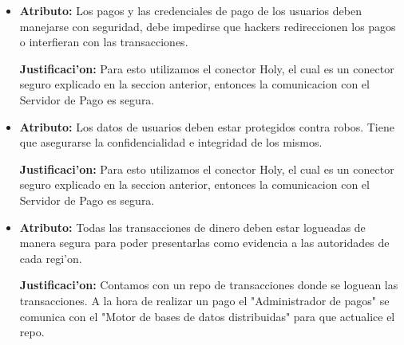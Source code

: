 \begin{itemize}
\item \textbf{Atributo:} Los pagos y las credenciales de pago de los usuarios deben manejarse con seguridad, debe impedirse que hackers redireccionen los pagos o interfieran con las transacciones.

\textbf{Justificaci'on:} Para esto utilizamos el conector Holy, el cual es un conector seguro explicado en la seccion anterior, entonces la comunicacion con el Servidor de Pago es segura.

\item \textbf{Atributo:} Los datos de usuarios deben estar protegidos contra robos. Tiene que asegurarse la confidencialidad e integridad de los mismos.

 \textbf{Justificaci'on:} Para esto utilizamos el conector Holy, el cual es un conector seguro explicado en la seccion anterior, entonces la comunicacion con el Servidor de Pago es segura.

\item \textbf{Atributo:} Todas las transacciones de dinero deben estar logueadas de manera segura para poder presentarlas como evidencia a las autoridades de cada regi'on.

 \textbf{Justificaci'on:} Contamos con un repo de transacciones donde se loguean las transacciones. A la hora de realizar un pago el "Administrador de pagos" se comunica con el "Motor de bases de datos distribuidas" para que actualice el repo.

\end{itemize}

